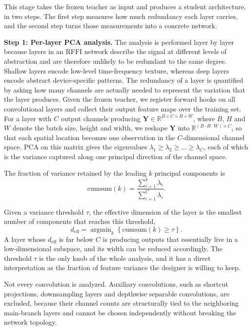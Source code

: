 \documentclass[journal,comsoc]{IEEEtran}
\DeclareMathOperator*{\argmin}{argmin}
\begin{document}
This stage takes the frozen teacher as input and produces a student architecture, in two steps. The first step measures how much redundancy each layer carries, and the second step turns those measurements into a concrete network.

\textbf{Step 1: Per-layer PCA analysis.}
The analysis is performed layer by layer because layers in an RFFI network describe the signal at different levels of abstraction and are therefore unlikely to be redundant to the same degree. Shallow layers encode low-level time-frequency texture, whereas deep layers encode abstract device-specific patterns. The redundancy of a layer is quantified by asking how many channels are actually needed to represent the variation that the layer produces. Given the frozen teacher, we register forward hooks on all convolutional layers and collect their output feature maps over the training set. For a layer with $C$ output channels producing $\mathbf{Y} \in \mathbb{R}^{B \times C \times H \times W}$, where $B$, $H$ and $W$ denote the batch size, height and width, we reshape $\mathbf{Y}$ into $\mathbb{R}^{(B\cdot H\cdot W) \times C}$, so that each spatial location becomes one observation in the $C$-dimensional channel space. PCA on this matrix gives the eigenvalues $\lambda_1 \ge \lambda_2 \ge \dots \ge \lambda_C$, each of which is the variance captured along one principal direction of the channel space.

The fraction of variance retained by the leading $k$ principal components is
\begin{equation}
\label{eq:cumsum}
\text{cumsum}(k) = \frac{\sum_{i=1}^{k} \lambda_i}{\sum_{i=1}^{C} \lambda_i}.
\end{equation}

Given a variance threshold $\tau$, the effective dimension of the layer is the smallest number of components that reaches this threshold,
\begin{equation}
\label{eq:eff_dim}
d_{\text{eff}} = \argmin_k \left\{ \text{cumsum}(k) \geq \tau \right\}.
\end{equation}
A layer whose $d_{\text{eff}}$ is far below $C$ is producing outputs that essentially live in a low-dimensional subspace, and its width can be reduced accordingly. The threshold $\tau$ is the only knob of the whole analysis, and it has a direct interpretation as the fraction of feature variance the designer is willing to keep.

Not every convolution is analyzed. Auxiliary convolutions, such as shortcut projections, downsampling layers and depthwise separable convolutions, are excluded, because their channel counts are structurally tied to the neighboring main-branch layers and cannot be chosen independently without breaking the network topology.
\end{document}
